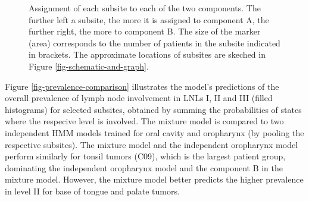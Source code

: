 \documentclass[11pt,twocolumn,twoside]{article}
\begin{document}
\begin{figure}


\caption{\label{fig-cluster-assignments}Assignment of each subsite to
each of the two components. The further left a subsite, the more it is
assigned to component A, the further right, the more to component B. The
size of the marker (area) corresponds to the number of patients in the
subsite indicated in brackets. The approximate locations of subsites are skeched in Figure \ref{fig-schematic-and-graph}.}

\end{figure}%

Figure \ref{fig-prevalence-comparison} illustrates the model's predictions of the overall prevalence of lymph node involvement in LNLs I, II and III (filled histograms) for selected subsites, obtained by summing the probabilities of states where the respecive level is involved. The mixture model is compared to two independent HMM models trained for oral cavity and oropharynx (by pooling the respective subsites). The mixture model and the independent oropharynx model perform similarly for tonsil tumors (C09), which is the largest patient group, dominating the independent oropharynx model and the component B in the mixture model. However, the mixture model better predicts the higher prevalence in level II for base of tongue and palate tumors. 
\end{document}
